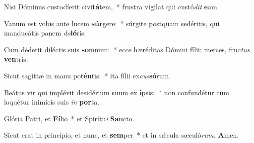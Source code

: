 \item Nisi Dóminus custodíerit civi\textbf{tá}tem,~* frustra vígilat qui custó\textit{dit} \textbf{e}am.
\item Vanum est vobis ante lucem \textbf{súr}gere:~* súrgite postquam sedéritis, qui manducátis panem \textit{do}\textbf{ló}ris.
\item Cum déderit diléctis suis \textbf{so}mnum:~* ecce hæréditas Dómini fílii: merces, fru\tinyhspace\textit{ctus} \textbf{ven}tris.
\item Sicut sagíttæ in manu pot\textbf{én}tis:~* ita fílii ex\tinyhspace\textit{cus}\textbf{só}rum.
\item Beátus vir qui implévit desidérium suum ex \textbf{i}psis:~* non confundétur cum loquétur inimícis suis \textit{in} \textbf{por}ta.
\item Glória Patri, et \textbf{Fí}lio~* et Spirítu\tinyhspace\textit{i} \textbf{San}cto.
\item Sicut erat in princípio, et nunc, et \textbf{sem}per~* et in sǽcula sæculó\textit{rum.} \textbf{A}men.